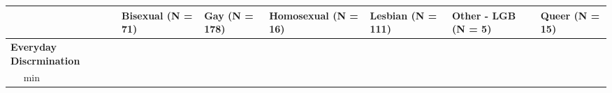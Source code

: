\documentclass[
  english,
  man,floatsintext]{apa6}
\begin{document}
\begin{longtable}[]{@{}lllllll@{}}
\toprule
\begin{minipage}[b]{0.14\columnwidth}\raggedright
\strut
\end{minipage} & \begin{minipage}[b]{0.11\columnwidth}\raggedright
Bisexual (N = 71)\strut
\end{minipage} & \begin{minipage}[b]{0.12\columnwidth}\raggedright
Gay (N = 178)\strut
\end{minipage} & \begin{minipage}[b]{0.10\columnwidth}\raggedright
Homosexual (N = 16)\strut
\end{minipage} & \begin{minipage}[b]{0.12\columnwidth}\raggedright
Lesbian (N = 111)\strut
\end{minipage} & \begin{minipage}[b]{0.10\columnwidth}\raggedright
Other - LGB (N = 5)\strut
\end{minipage} & \begin{minipage}[b]{0.11\columnwidth}\raggedright
Queer (N = 15)\strut
\end{minipage}\tabularnewline
\midrule
\endhead
\begin{minipage}[t]{0.14\columnwidth}\raggedright
\textbf{Everyday Discrmination}\strut
\end{minipage} & \begin{minipage}[t]{0.11\columnwidth}\raggedright
~~\strut
\end{minipage} & \begin{minipage}[t]{0.12\columnwidth}\raggedright
~~\strut
\end{minipage} & \begin{minipage}[t]{0.10\columnwidth}\raggedright
~~\strut
\end{minipage} & \begin{minipage}[t]{0.12\columnwidth}\raggedright
~~\strut
\end{minipage} & \begin{minipage}[t]{0.10\columnwidth}\raggedright
~~\strut
\end{minipage} & \begin{minipage}[t]{0.11\columnwidth}\raggedright
~~\strut
\end{minipage}\tabularnewline
\begin{minipage}[t]{0.14\columnwidth}\raggedright
~~ min\strut
\end{minipage} & \begin{minipage}[t]{0.11\columnwidth}\raggedright

\end{minipage}
\end{longtable}
\end{document}
